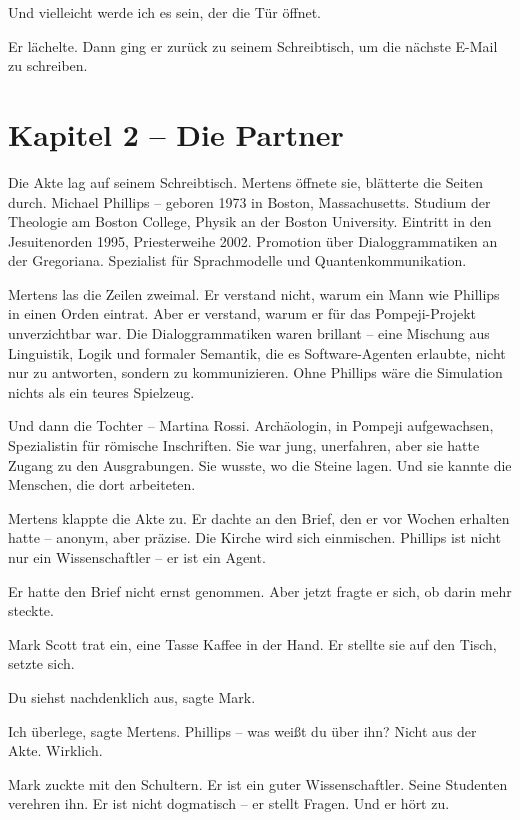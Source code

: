 \documentclass[
]{article}
\begin{document}
Und vielleicht werde ich es sein, der die Tür öffnet.

Er lächelte. Dann ging er zurück zu seinem Schreibtisch, um die nächste E-Mail zu schreiben.

\newpage

\section{Kapitel 2 -- Die Partner}

Die Akte lag auf seinem Schreibtisch. Mertens öffnete sie, blätterte die Seiten durch. Michael Phillips -- geboren 1973 in Boston, Massachusetts. Studium der Theologie am Boston College, Physik an der Boston University. Eintritt in den Jesuitenorden 1995, Priesterweihe 2002. Promotion über Dialoggrammatiken an der Gregoriana. Spezialist für Sprachmodelle und Quantenkommunikation.

Mertens las die Zeilen zweimal. Er verstand nicht, warum ein Mann wie Phillips in einen Orden eintrat. Aber er verstand, warum er für das Pompeji-Projekt unverzichtbar war. Die Dialoggrammatiken waren brillant -- eine Mischung aus Linguistik, Logik und formaler Semantik, die es Software-Agenten erlaubte, nicht nur zu antworten, sondern zu kommunizieren. Ohne Phillips wäre die Simulation nichts als ein teures Spielzeug.

Und dann die Tochter -- Martina Rossi. Archäologin, in Pompeji aufgewachsen, Spezialistin für römische Inschriften. Sie war jung, unerfahren, aber sie hatte Zugang zu den Ausgrabungen. Sie wusste, wo die Steine lagen. Und sie kannte die Menschen, die dort arbeiteten.

Mertens klappte die Akte zu. Er dachte an den Brief, den er vor Wochen erhalten hatte -- anonym, aber präzise. \glqq Die Kirche wird sich einmischen. Phillips ist nicht nur ein Wissenschaftler -- er ist ein Agent.\grqq

Er hatte den Brief nicht ernst genommen. Aber jetzt fragte er sich, ob darin mehr steckte.

Mark Scott trat ein, eine Tasse Kaffee in der Hand. Er stellte sie auf den Tisch, setzte sich.

\glqq Du siehst nachdenklich aus\grqq, sagte Mark.

\glqq Ich überlege\grqq, sagte Mertens. \glqq Phillips -- was weißt du über ihn? Nicht aus der Akte. Wirklich.\grqq

Mark zuckte mit den Schultern. \glqq Er ist ein guter Wissenschaftler. Seine Studenten verehren ihn. Er ist nicht dogmatisch -- er stellt Fragen. Und er hört zu.\grqq
\end{document}
